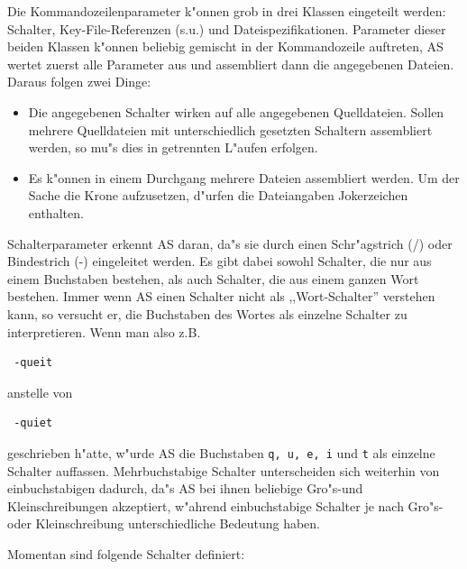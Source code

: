 \documentclass[12pt,a4paper,twoside]{report}
\makeatletter
\newcommand{\tty}[1]{{\tt #1}}
\newcommand{\ttindex}[1]{\index{#1@{\tt #1}}}
\newcommand{\asname}{AS}
\makeatother
\begin{document}
Die Kommandozeilenparameter k"onnen grob in drei Klassen eingeteilt
werden: Schalter, Key-File-Referenzen (s.u.) und Dateispezifikationen.
Parameter dieser beiden Klassen k"onnen beliebig gemischt in der
Kommandozeile auftreten, \asname{} wertet zuerst alle Parameter aus und
assembliert dann die angegebenen Dateien. Daraus folgen zwei Dinge:
\begin{itemize}
\item{Die angegebenen Schalter wirken auf alle angegebenen Quelldateien.
      Sollen mehrere Quelldateien mit unterschiedlich gesetzten Schaltern
      assembliert werden, so mu"s dies in getrennten L"aufen erfolgen.}
\item{Es k"onnen in einem Durchgang mehrere Dateien assembliert werden.
      Um der Sache die Krone aufzusetzen, d"urfen die Dateiangaben
      Jokerzeichen enthalten.}
\end{itemize}
Schalterparameter erkennt \asname{} daran, da"s sie durch einen
Schr"agstrich (/) oder Bindestrich (-) eingeleitet werden.  Es gibt dabei
sowohl Schalter, die nur aus einem Buchstaben bestehen, als auch Schalter,
die aus einem ganzen Wort bestehen.  Immer wenn \asname{} einen Schalter nicht
als ,,Wort-Schalter'' verstehen kann, so versucht er, die Buchstaben des
Wortes als einzelne Schalter zu interpretieren.  Wenn man also z.B.
\begin{verbatim}
 -queit
\end{verbatim}
anstelle von
\begin{verbatim}
 -quiet
\end{verbatim}
geschrieben h"atte, w"urde \asname{} die Buchstaben \tty{q, u, e, i} und \tty{t}
als einzelne Schalter auffassen.  Mehrbuchstabige Schalter unterscheiden
sich weiterhin von einbuchstabigen dadurch, da"s \asname{} bei ihnen beliebige
Gro"s-und Kleinschreibungen akzeptiert, w"ahrend einbuchstabige Schalter
je nach Gro"s- oder Kleinschreibung unterschiedliche Bedeutung haben.
\par
Momentan sind folgende Schalter definiert:
\ttindex{SHARED}
\end{document}

